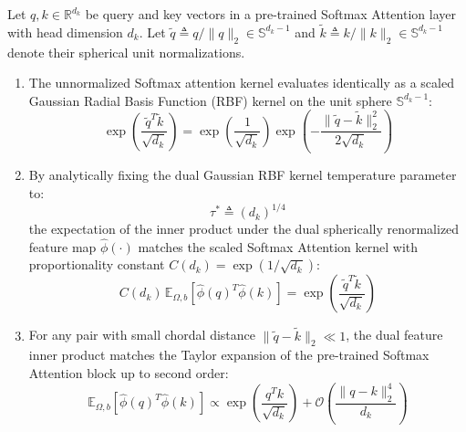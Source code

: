 
\begin{theorem}
\label{thm:transmutation}
Let $q, k \in \mathbb{R}^{d_k}$ be query and key vectors in a pre-trained Softmax Attention layer with head dimension $d_k$. Let $\tilde{q} \triangleq q / \|q\|_2 \in \mathbb{S}^{d_k-1}$ and $\tilde{k} \triangleq k / \|k\|_2 \in \mathbb{S}^{d_k-1}$ denote their spherical unit normalizations.
\begin{enumerate}[label=(\roman*)]
    \item The unnormalized Softmax attention kernel evaluates identically as a scaled Gaussian Radial Basis Function (RBF) kernel on the unit sphere $\mathbb{S}^{d_k-1}$:
    \begin{equation}
    \exp\left( \frac{\tilde{q}^T \tilde{k}}{\sqrt{d_k}} \right) = \exp\left( \frac{1}{\sqrt{d_k}} \right) \exp\left( -\frac{\|\tilde{q} - \tilde{k}\|_2^2}{2\sqrt{d_k}} \right)
    \label{eq:transmutation_exact_identity}
    \end{equation}
    \item By analytically fixing the dual Gaussian RBF kernel temperature parameter to:
    \begin{equation}
    \tau^* \triangleq (d_k)^{1/4}
    \label{eq:optimal_tau_star}
    \end{equation}
    the expectation of the inner product under the dual spherically renormalized feature map $\hat{\phi}(\cdot)$ matches the scaled Softmax Attention kernel with proportionality constant $C(d_k) = \exp(1/\sqrt{d_k})$:
    \begin{equation}
    C(d_k) \, \mathbb{E}_{\Omega, b}\left[ \hat{\phi}(q)^T \hat{\phi}(k) \right] = \exp\left( \frac{\tilde{q}^T \tilde{k}}{\sqrt{d_k}} \right)
    \label{eq:expectation_match}
    \end{equation}
    \item For any pair with small chordal distance $\|\tilde{q} - \tilde{k}\|_2 \ll 1$, the dual feature inner product matches the Taylor expansion of the pre-trained Softmax Attention block up to second order:
    \begin{equation}
    \mathbb{E}_{\Omega, b}\left[ \hat{\phi}(q)^T \hat{\phi}(k) \right] \propto \exp\left( \frac{q^T k}{\sqrt{d_k}} \right) + \mathcal{O}\left( \frac{\|q - k\|_2^4}{d_k} \right)
    \label{eq:taylor_expansion_match}
    \end{equation}
\end{enumerate}
\end{theorem}

